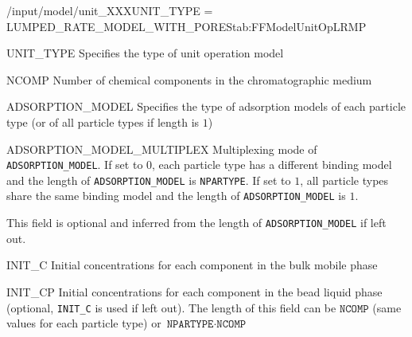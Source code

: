 \begin{condsubgroup}{/input/model/unit\_XXX}{UNIT\_TYPE = LUMPED\_RATE\_MODEL\_WITH\_PORES}{tab:FFModelUnitOpLRMP}
  \begin{dataset}[type=string,range={\texttt{LUMPED\_RATE\_MODEL\_WITH\_PORES}},length=1]{UNIT\_TYPE}
    Specifies the type of unit operation model
  \end{dataset}
  \begin{dataset}[type=int,range={$\geq 1$},length=1]{NCOMP}
    Number of chemical components in the chromatographic medium
  \end{dataset}
  \begin{dataset}[type=string,range={See Section~\ref{sec:FFAdsorption}},length={$1$ / \texttt{NPARTYPE}}]{ADSORPTION\_MODEL}
    Specifies the type of adsorption models of each particle type (or of all particle types if length is $1$)
  \end{dataset}
  \begin{dataset}[unit=--,type=int,range={$\{0, 1\}$},length={1}]{ADSORPTION\_MODEL\_MULTIPLEX}
    Multiplexing mode of \texttt{ADSORPTION\_MODEL}.
    If set to $0$, each particle type has a different binding model and the length of \texttt{ADSORPTION\_MODEL} is \texttt{NPARTYPE}.
    If set to $1$, all particle types share the same binding model and the length of \texttt{ADSORPTION\_MODEL} is $1$.

    This field is optional and inferred from the length of \texttt{ADSORPTION\_MODEL} if left out.
  \end{dataset}
  \begin{dataset}[unit=\si{\mol\per\cubic\metre\of{IV}},type=double,range={$\geq 0$},length={\texttt{NCOMP}}]{INIT\_C}
    Initial concentrations for each component in the bulk mobile phase
  \end{dataset}
  \begin{dataset}[unit=\si{\mol\per\cubic\metre\of{MP}},type=double,range={$\geq 0$},length={\texttt{NCOMP} / $\texttt{NPARTYPE} \cdot \texttt{NCOMP}$}]{INIT\_CP}
    Initial concentrations for each component in the bead liquid phase (optional, \texttt{INIT\_C} is used if left out).
    The length of this field can be $\texttt{NCOMP}$ (same values for each particle type) or $\texttt{NPARTYPE} \cdot \texttt{NCOMP}$


\end{dataset}
\end{condsubgroup}
